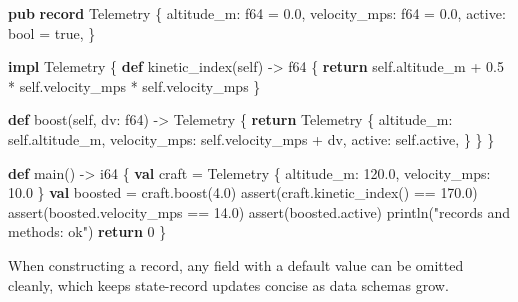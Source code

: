 \documentclass[
  english,
  oneside]{book}
\newenvironment{Shaded}{\begin{snugshade}}{\end{snugshade}}
\newcommand{\ConstantTok}[1]{\textcolor[rgb]{0.31,0.76,1.00}{#1}}
\newcommand{\ControlFlowTok}[1]{\textcolor[rgb]{0.77,0.53,0.75}{\textbf{#1}}}
\newcommand{\DataTypeTok}[1]{\textcolor[rgb]{0.31,0.79,0.69}{#1}}
\newcommand{\DecValTok}[1]{\textcolor[rgb]{0.71,0.81,0.66}{#1}}
\newcommand{\FloatTok}[1]{\textcolor[rgb]{0.71,0.81,0.66}{#1}}
\newcommand{\FunctionTok}[1]{\textcolor[rgb]{0.86,0.86,0.67}{#1}}
\newcommand{\KeywordTok}[1]{\textcolor[rgb]{0.34,0.61,0.84}{\textbf{#1}}}
\newcommand{\NormalTok}[1]{\textcolor[rgb]{0.83,0.83,0.83}{#1}}
\newcommand{\OperatorTok}[1]{\textcolor[rgb]{0.83,0.83,0.83}{#1}}
\newcommand{\StringTok}[1]{\textcolor[rgb]{0.81,0.57,0.47}{#1}}
\begin{document}
\begin{Shaded}
\begin{Highlighting}[]
\KeywordTok{pub} \KeywordTok{record}\NormalTok{ Telemetry \{}
\NormalTok{    altitude\_m: }\DataTypeTok{f64} \OperatorTok{=} \FloatTok{0.0}\NormalTok{,}
\NormalTok{    velocity\_mps: }\DataTypeTok{f64} \OperatorTok{=} \FloatTok{0.0}\NormalTok{,}
\NormalTok{    active: }\DataTypeTok{bool} \OperatorTok{=} \ConstantTok{true}\NormalTok{,}
\NormalTok{\}}

\KeywordTok{impl}\NormalTok{ Telemetry \{}
    \KeywordTok{def}\NormalTok{ kinetic\_index(self) }\OperatorTok{{-}\textgreater{}} \DataTypeTok{f64}\NormalTok{ \{}
        \ControlFlowTok{return}\NormalTok{ self}\OperatorTok{.}\NormalTok{altitude\_m }\OperatorTok{+} \FloatTok{0.5} \OperatorTok{*}\NormalTok{ self}\OperatorTok{.}\NormalTok{velocity\_mps }\OperatorTok{*}\NormalTok{ self}\OperatorTok{.}\NormalTok{velocity\_mps}
\NormalTok{    \}}

    \KeywordTok{def}\NormalTok{ boost(self, dv: }\DataTypeTok{f64}\NormalTok{) }\OperatorTok{{-}\textgreater{}}\NormalTok{ Telemetry \{}
        \ControlFlowTok{return}\NormalTok{ Telemetry \{}
\NormalTok{            altitude\_m: self}\OperatorTok{.}\NormalTok{altitude\_m,}
\NormalTok{            velocity\_mps: self}\OperatorTok{.}\NormalTok{velocity\_mps }\OperatorTok{+}\NormalTok{ dv,}
\NormalTok{            active: self}\OperatorTok{.}\NormalTok{active,}
\NormalTok{        \}}
\NormalTok{    \}}
\NormalTok{\}}

\KeywordTok{def}\NormalTok{ main() }\OperatorTok{{-}\textgreater{}} \DataTypeTok{i64}\NormalTok{ \{}
    \KeywordTok{val}\NormalTok{ craft }\OperatorTok{=}\NormalTok{ Telemetry \{ altitude\_m: }\FloatTok{120.0}\NormalTok{, velocity\_mps: }\FloatTok{10.0}\NormalTok{ \}}
    \KeywordTok{val}\NormalTok{ boosted }\OperatorTok{=}\NormalTok{ craft}\OperatorTok{.}\NormalTok{boost(}\FloatTok{4.0}\NormalTok{)}
    \FunctionTok{assert}\NormalTok{(craft}\OperatorTok{.}\NormalTok{kinetic\_index() }\OperatorTok{==} \FloatTok{170.0}\NormalTok{)}
    \FunctionTok{assert}\NormalTok{(boosted}\OperatorTok{.}\NormalTok{velocity\_mps }\OperatorTok{==} \FloatTok{14.0}\NormalTok{)}
    \FunctionTok{assert}\NormalTok{(boosted}\OperatorTok{.}\NormalTok{active)}
\NormalTok{    println(}\StringTok{"records and methods: ok"}\NormalTok{)}
    \ControlFlowTok{return} \DecValTok{0}
\NormalTok{\}}
\end{Highlighting}
\end{Shaded}

When constructing a record, any field with a default value can be
omitted cleanly, which keeps state-record updates concise as data
schemas grow.
\end{document}
